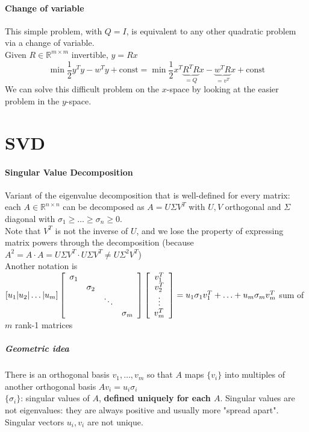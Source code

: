 \documentclass[10pt]{report}
\begin{document}
\paragraph{Change of variable} This simple problem, with $Q=I$, is equivalent to any other quadratic problem via a change of variable.\\
Given $R\in\mathbb{R}^{m\times m}$ invertible, $y=Rx$
$$\min\frac{1}{2}y^Ty - w^Ty+\text{const} = \min\frac{1}{2}x^T\underset{=Q}{\underbrace{R^TR}}x - \underset{=v^T}{\underbrace{w^TR}}x+\text{const}$$
We can solve this difficult problem on the $x$-space by looking at the easier problem in the $y$-space.
\section{SVD}
\paragraph{Singular Value Decomposition} Variant of the eigenvalue decomposition that is well-defined for every matrix: each $A\in \mathbb{R}^{n\times n}$ can be decomposed as $A = U\Sigma V^T$ with $U, V$ orthogonal and $\Sigma$ diagonal with $\sigma_1 \geq \ldots \geq \sigma_n \geq 0$.\\
Note that $V^T$ is not the inverse of $U$, and we lose the property of expressing matrix powers through the decomposition (because $A^2=A\cdot A=U\Sigma V^T\cdot U\Sigma V^T\neq U\Sigma^2 V^T$)\\
Another notation is $[u_1|u_2|\ldots|u_m]\left[\begin{array}{c c c c}
\sigma_1\\ & \sigma_2\\ & & \ddots\\ & & & \sigma_m
\end{array} \right]\left[\begin{array}{c}
v_1^T\\v_2^T\\\vdots\\v_m^T
\end{array} \right] = u_1\sigma_1 v_1^T + \ldots + u_m\sigma_m v_m^T$ sum of $m$ rank-1 matrices\\
\subparagraph{Geometric idea} There is an orthogonal basis $v_1,\ldots, v_m$ so that $A$ maps $\{v_i\}$ into multiples of another orthogonal basis $A v_i = u_i \sigma_i$\\
$\{\sigma_i\}$: singular values of $A$, \textbf{defined uniquely for each $A$}. Singular values are not eigenvalues: they are always positive and usually more "spread apart".\\Singular vectors $u_i, v_i$ are not unique.
\end{document}
